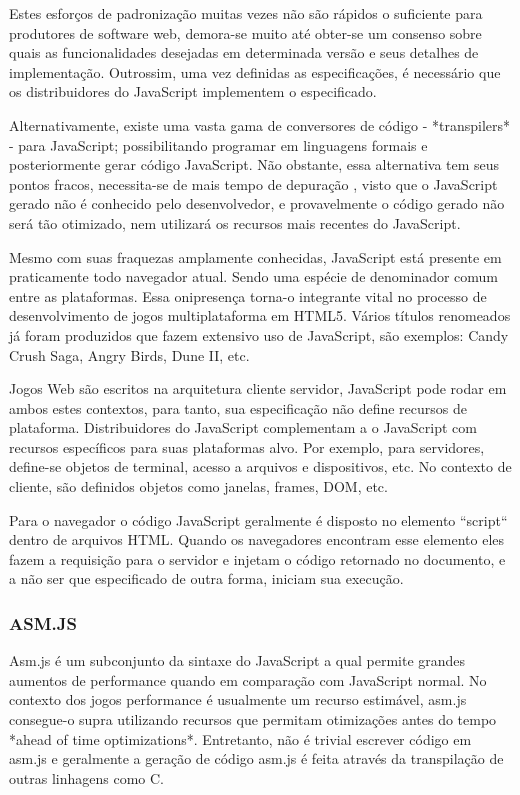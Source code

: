\documentclass[11pt,a4paper]{article}
\begin{document}
Estes esforços de padronização muitas vezes não são rápidos
o suficiente para produtores de software web, demora-se muito até
obter-se um consenso sobre quais as funcionalidades desejadas em
determinada versão e seus detalhes de implementação. Outrossim, uma
vez definidas as especificações, é necessário que os distribuidores
do JavaScript implementem o especificado.

Alternativamente, existe uma vasta gama de conversores de código -
*transpilers* - para JavaScript; possibilitando programar em linguagens
formais e posteriormente gerar código JavaScript. Não obstante,
essa alternativa tem seus pontos fracos, necessita-se de mais tempo
de depuração , visto que o JavaScript gerado não é conhecido
pelo desenvolvedor, e provavelmente o código gerado não será tão
otimizado, nem utilizará os recursos mais recentes do JavaScript.

Mesmo com suas fraquezas amplamente conhecidas, JavaScript está
presente em praticamente todo navegador atual. Sendo uma espécie de
denominador comum entre as plataformas. Essa onipresença torna-o
integrante vital no processo de desenvolvimento de jogos multiplataforma
em HTML5. Vários títulos renomeados já foram produzidos que fazem
extensivo uso de JavaScript, são exemplos: Candy Crush Saga, Angry
Birds, Dune II, etc.

Jogos Web são escritos na arquitetura cliente servidor, JavaScript pode
rodar em ambos estes contextos, para tanto, sua especificação não
define recursos de plataforma. Distribuidores do JavaScript complementam
a o JavaScript com recursos específicos para suas plataformas alvo.
Por exemplo, para servidores, define-se objetos de terminal, acesso a
arquivos e dispositivos, etc. No contexto de cliente, são definidos
objetos como janelas, frames, DOM, etc.

Para o navegador o código JavaScript geralmente é disposto no elemento
``script`` dentro de arquivos HTML. Quando os navegadores encontram esse
elemento eles fazem a requisição para o servidor e injetam o código
retornado no documento, e a não ser que especificado de outra forma,
iniciam sua execução.

\subsubsection{ ASM.JS}

Asm.js é um subconjunto da sintaxe do JavaScript a qual permite grandes
aumentos de performance quando em comparação com JavaScript normal.
No contexto dos jogos performance é usualmente um recurso estimável,
asm.js consegue-o supra utilizando recursos que permitam otimizações
antes do tempo *ahead of time optimizations*. Entretanto, não é
trivial escrever código em asm.js e geralmente a geração de código
asm.js é feita através da transpilação de outras linhagens como C.
\end{document}
